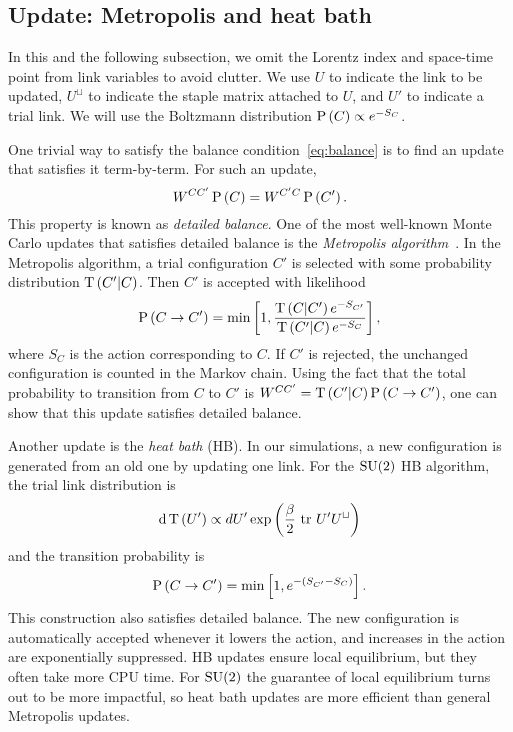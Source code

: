 \subsection{Update: Metropolis and heat bath}
In this and the following subsection,
we omit the Lorentz index and space-time point from link variables to
avoid clutter.  We use $U$ to indicate the link to be updated, 
$U^\sqcup$ to indicate the staple matrix attached to $U$, and
$U'$ to indicate a trial link. We will use the Boltzmann
distribution $\operatorname{P}\left(C\right)\propto e^{-S_C}$.

One trivial way to satisfy the balance condition~\eqref{eq:balance} is
to find an update that satisfies it term-by-term. For such an update, 
\begin{equation}\label{eq:detailedbalance}\index{detailed balance}
    W^{CC'}\pr{C}=W^{C'C}\pr{C'}.
\end{equation}
This property is known as {\it detailed balance}.
One of the most well-known Monte Carlo updates that satisfies detailed
balance is the {\it Metropolis algorithm}~\cite{metropolis_equation_1953}. 
In the Metropolis algorithm, a trial configuration $C'$ is selected 
with some probability distribution $\operatorname{T}\left(C'|C\right)$. Then $C'$
is accepted with likelihood
\begin{equation}\label{eq:metupdate}
  \operatorname{P}\left(C\to C'\right)=\min\left[1,\frac{\operatorname{T}\left(C|C'\right)e^{-S_{C'}}}
    {\operatorname{T}\left(C'|C\right)e^{-S_C}}\right],
\end{equation}
where $S_C$ is the action corresponding to $C$. 
If $C'$ is rejected, the unchanged configuration is counted
in the Markov chain. Using the fact that the total probability
to transition from $C$ to $C'$ is $W^{CC'}=\operatorname{T}\left(C'|C\right)\operatorname{P}\left(C\to C'\right)$, one
can show that this update satisfies detailed balance.

Another update is the {\it heat bath} (HB). In our
simulations, a new configuration is generated from an old one by updating one
link. For the $\operatorname{SU}(2)$ HB algorithm, the trial link distribution is
\begin{equation}\label{eq:PTdist}
  \dd{\operatorname{T}\left(U'\right)}\propto dU'\exp\left(\frac{\beta}{2}\,\tr\,
  U'U^\sqcup\right)
\end{equation}
and the transition probability is
\begin{equation}
  \operatorname{P}\left(C\to C'\right)=\min\left[1,e^{-(S_{C'}-S_C)}\right].
\end{equation}
This construction also satisfies detailed balance. The new configuration 
is automatically accepted whenever it lowers the action, and
increases in the action are exponentially suppressed.
HB updates ensure local equilibrium, but they often 
take more CPU time. For $\operatorname{SU}(2)$ the guarantee of local equilibrium
turns out to be more impactful, so heat bath updates are more efficient
than general Metropolis updates.


